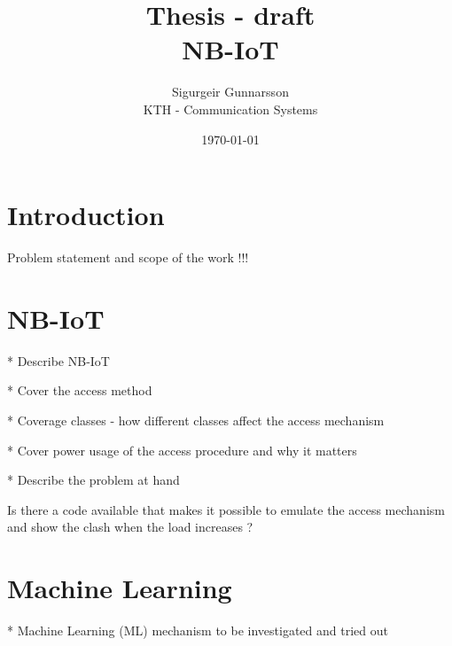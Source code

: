 \documentclass[10pt,a4paper,titlepage,twoside]{article}
\title{\blue Thesis - draft \\
\blueb NB-IoT}
\author{Sigurgeir Gunnarsson \\KTH - Communication Systems}
\date{\today}
\begin{document}
\maketitle


\thispagestyle{empty}
\tableofcontents

\cleardoublepage
\newpage
\setcounter{page}{1}


\section{Introduction}

Problem statement and scope of the work !!!



\clearpage
\section{NB-IoT}

* Describe NB-IoT

* Cover the access method

* Coverage classes - how different classes affect the access mechanism

* Cover power usage of the access procedure and why it matters

* Describe the problem at hand

Is there a code available that makes it possible to emulate the access mechanism and show the clash when the load increases ?

\clearpage
\section{Machine Learning}

* Machine Learning (ML) mechanism to be investigated and tried out
\end{document}
